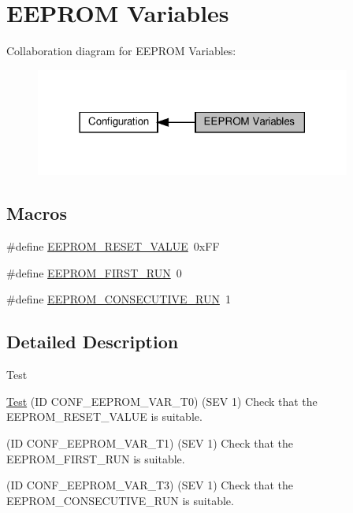 \hypertarget{group__defines__eeprom__variables}{}\section{E\+E\+P\+R\+OM Variables}
\label{group__defines__eeprom__variables}
Collaboration diagram for E\+E\+P\+R\+OM Variables\+:
\nopagebreak
\begin{figure}[H]
\begin{center}
\leavevmode
\includegraphics[width=294pt]{group__defines__eeprom__variables}
\end{center}
\end{figure}
\subsection*{Macros}
\begin{DoxyCompactItemize}
\item 
\#define \hyperlink{group__defines__eeprom__variables_ga8f38e463d430bf270a1de27b0af7fd58}{E\+E\+P\+R\+O\+M\+\_\+\+R\+E\+S\+E\+T\+\_\+\+V\+A\+L\+UE}~0x\+FF
\item 
\#define \hyperlink{group__defines__eeprom__variables_ga7780f2cb8d674288b763835a3e81131a}{E\+E\+P\+R\+O\+M\+\_\+\+F\+I\+R\+S\+T\+\_\+\+R\+UN}~0
\item 
\#define \hyperlink{group__defines__eeprom__variables_ga51cfc165574fa74c6e372080bd3fa2f7}{E\+E\+P\+R\+O\+M\+\_\+\+C\+O\+N\+S\+E\+C\+U\+T\+I\+V\+E\+\_\+\+R\+UN}~1
\end{DoxyCompactItemize}


\subsection{Detailed Description}
\begin{DoxyRefDesc}{Test}
\item[\hyperlink{test__test000021}{Test}](ID C\+O\+N\+F\+\_\+\+E\+E\+P\+R\+O\+M\+\_\+\+V\+A\+R\+\_\+\+T0) (S\+EV 1) Check that the E\+E\+P\+R\+O\+M\+\_\+\+R\+E\+S\+E\+T\+\_\+\+V\+A\+L\+UE is suitable. 

(ID C\+O\+N\+F\+\_\+\+E\+E\+P\+R\+O\+M\+\_\+\+V\+A\+R\+\_\+\+T1) (S\+EV 1) Check that the E\+E\+P\+R\+O\+M\+\_\+\+F\+I\+R\+S\+T\+\_\+\+R\+UN is suitable. 

(ID C\+O\+N\+F\+\_\+\+E\+E\+P\+R\+O\+M\+\_\+\+V\+A\+R\+\_\+\+T3) (S\+EV 1) Check that the E\+E\+P\+R\+O\+M\+\_\+\+C\+O\+N\+S\+E\+C\+U\+T\+I\+V\+E\+\_\+\+R\+UN is suitable.\end{DoxyRefDesc}



